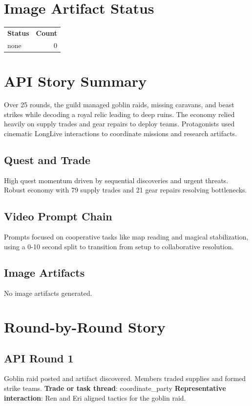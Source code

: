 \documentclass[11pt,a4paper]{article}
\begin{document}
\section{Image Artifact Status}
\begin{longtable}{lr}
\textbf{Status} & \textbf{Count}\\
none & 0 \\
\end{longtable}

\section{API Story Summary}
Over 25 rounds, the guild managed goblin raids, missing caravans, and beast strikes while decoding a royal relic leading to deep ruins. The economy relied heavily on supply trades and gear repairs to deploy teams. Protagonists used cinematic LongLive interactions to coordinate missions and research artifacts.

\subsection{Quest and Trade}
High quest momentum driven by sequential discoveries and urgent threats. Robust economy with 79 supply trades and 21 gear repairs resolving bottlenecks.

\subsection{Video Prompt Chain}
Prompts focused on cooperative tasks like map reading and magical stabilization, using a 0-10 second split to transition from setup to collaborative resolution.

\subsection{Image Artifacts}
No image artifacts generated.

\section{Round-by-Round Story}
\subsection{API Round 1}
Goblin raid posted and artifact discovered. Members traded supplies and formed strike teams.
\newline \textbf{Trade or task thread}: coordinate\_party
\newline \textbf{Representative interaction}: Ren and Eri aligned tactics for the goblin raid.
\end{document}
